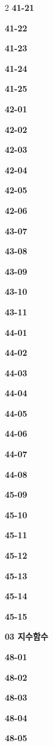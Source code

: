 \documentclass[10pt,a4paper]{article}
\begin{document}
\begin{multicols}{2}
\noindent\textbf{41-21}\ \par
\noindent\textbf{41-22}\ \par
\noindent\textbf{41-23}\ \par
\noindent\textbf{41-24}\ \par
\noindent\textbf{41-25}\ \par
\noindent\textbf{42-01}\ \par
\noindent\textbf{42-02}\ \par
\noindent\textbf{42-03}\ \par
\noindent\textbf{42-04}\ \par
\noindent\textbf{42-05}\ \par
\noindent\textbf{42-06}\ \par
\noindent\textbf{43-07}\ \par
\noindent\textbf{43-08}\ \par
\noindent\textbf{43-09}\ \par
\noindent\textbf{43-10}\ \par
\noindent\textbf{43-11}\ \par
\noindent\textbf{44-01}\ \par
\noindent\textbf{44-02}\ \par
\noindent\textbf{44-03}\ \par
\noindent\textbf{44-04}\ \par
\noindent\textbf{44-05}\ \par
\noindent\textbf{44-06}\ \par
\noindent\textbf{44-07}\ \par
\noindent\textbf{44-08}\ \par
\noindent\textbf{45-09}\ \par
\noindent\textbf{45-10}\ \par
\noindent\textbf{45-11}\ \par
\noindent\textbf{45-12}\ \par
\noindent\textbf{45-13}\ \par
\noindent\textbf{45-14}\ \par
\noindent\textbf{45-15}\ \par
\noindent\textbf{03 지수함수}\par\smallskip
\noindent\textbf{48-01}\ \par
\noindent\textbf{48-02}\ \par
\noindent\textbf{48-03}\ \par
\noindent\textbf{48-04}\ \par
\noindent\textbf{48-05}\ \par

\end{multicols}
\end{document}
